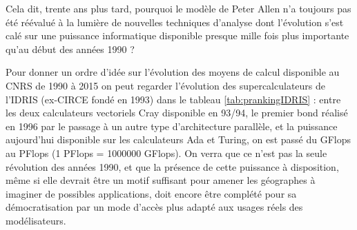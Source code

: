 Cela dit, trente ans plus tard, pourquoi le modèle de Peter Allen n'a toujours pas été réévalué à la lumière de nouvelles techniques d'analyse dont l'évolution s'est calé sur une puissance informatique disponible presque mille fois plus importante qu'au début des années 1990 ?

Pour donner un ordre d'idée sur l'évolution des moyens de calcul disponible au CNRS de 1990 à 2015 on peut regarder l'évolution des supercalculateurs de l'IDRIS (ex-CIRCE fondé en 1993) dans le tableau \ref{tab:prankingIDRIS} : entre les deux calculateurs vectoriels Cray disponible en 93/94, le premier bond réalisé en 1996 par le passage à un autre type d'architecture parallèle, et la puissance aujourd'hui disponible sur les calculateurs Ada et Turing, on est passé du GFlops au PFlops (1 PFlops = 1000000 GFlops). On verra que ce n'est pas la seule révolution des années 1990, et que la présence de cette puissance à disposition, même si elle devrait être un motif suffisant pour amener les géographes à imaginer de possibles applications, doit encore être complété pour sa démocratisation par un mode d'accès plus adapté aux usages réels des modélisateurs.

